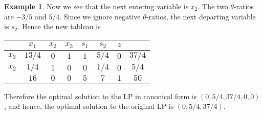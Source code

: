 \documentclass[a4paper, 12pt]{article}
\numberwithin{equation}{section}
\numberwithin{figure}{section}
\theoremstyle{definition}
\newtheorem{ex}[thm]{Example}
\begin{document}
\begin{ex}
	Now we see that the next entering variable is $x_2$. The two $\theta$-ratios
	are $-3/5$ and $5/4$. Since we ignore negative $\theta$-ratios, the next
	departing variable is $s_2$. Hence the new tableau is 
	\begin{center}
		\begin{tabular}{|c|cccccc|c|}
			\hline
			& $x_1$ & $x_2$ & $x_3$ & $s_1$ & $s_2$ & $z$ & \\ \hline
			$x_3$ & $13/4$ & $0$ & $1$ & $1$ & $5/4$ & $0$ & $37/4$ \\ \hline
			$x_2$ & $1/4$ & $1$ & $0$ & $0$ & $1/4$ & $0$ & $5/4$ \\ \hline 
			& $16$ & $0$ & $0$ & $5$ & $7$ & $1$ & $50$ \\ \hline
		\end{tabular}
	\end{center}
	Therefore the optimal solution to the LP in canonical form is $(0,5/4,
	37/4,0,0)$, and hence, the optimal solution to the original LP is $(0,5/4,
	37/4)$.
\end{ex}




\newpage

 

\end{document}
